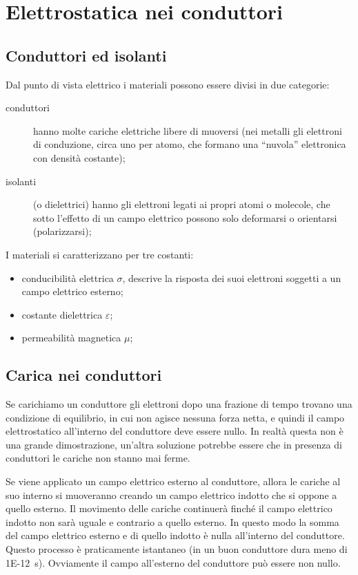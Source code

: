 \chapter{Elettrostatica nei conduttori}
\minitoc
\section{Conduttori ed isolanti}
Dal punto di vista elettrico i materiali possono essere divisi in due categorie:
\begin{description}
  \item[conduttori] hanno molte cariche elettriche libere di muoversi (nei metalli gli elettroni di conduzione, circa uno per atomo, che formano una ``nuvola'' elettronica con densità costante);
  \item[isolanti] (o dielettrici) hanno gli elettroni legati ai propri atomi o molecole, che sotto l'effetto di un campo elettrico possono solo deformarsi o orientarsi (polarizzarsi);
\end{description}
I materiali si caratterizzano per tre costanti:
\begin{itemize}
  \item conducibilità elettrica $\sigma$, descrive la risposta dei suoi elettroni soggetti a un campo elettrico esterno;
  \item costante dielettrica $\varepsilon$;
  \item permeabilità magnetica $\mu$;
\end{itemize}

\section{Carica nei conduttori}
Se carichiamo un conduttore gli elettroni dopo una frazione di tempo trovano una condizione di equilibrio, in cui non agisce nessuna forza netta,  e quindi il campo elettrostatico all'interno del conduttore deve essere nullo. In realtà questa non è una grande dimostrazione, un'altra soluzione potrebbe essere che in presenza di conduttori le cariche non stanno mai ferme.

Se viene applicato un campo elettrico esterno al conduttore, allora le cariche al suo interno si muoveranno creando un campo elettrico indotto che si oppone a quello esterno. Il movimento delle cariche continuerà finché il campo elettrico indotto non sarà uguale e contrario a quello esterno. In questo modo la somma del campo elettrico esterno e di quello indotto è nulla all'interno del conduttore. Questo processo è praticamente istantaneo (in un buon conduttore dura meno di \SI{1E-12}{\second}). Ovviamente il campo all'esterno del conduttore può essere non nullo.

